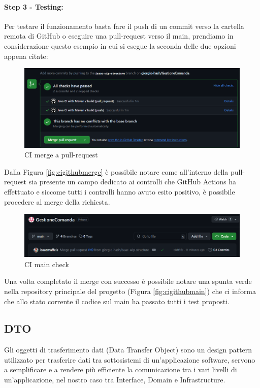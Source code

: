 \paragraph{Step 3 - Testing:}
Per testare il funzionamento basta fare il push di un commit verso la cartella remota di GitHub o eseguire una pull-request verso il main, prendiamo in considerazione questo esempio in cui si esegue la seconda delle due opzioni appena citate:
\begin{figure}[H]
    \centering
    \includegraphics[width=1\linewidth]{iterazione1//images/github_actions_merge.png}
    \caption{CI merge a pull-request}
    \label{fig:cigithubmerge}
\end{figure}
Dalla Figura \vref{fig:cigithubmerge} è possibile notare come all'interno della pull-request sia presente un campo dedicato ai controlli che GitHub Actions ha effettuato e siccome tutti i controlli hanno avuto esito positivo, è possibile procedere al merge della richiesta.
\begin{figure}[H]
    \centering
    \includegraphics[width=1\linewidth]{iterazione1//images/github_actions_main}
    \caption{CI main check}
    \label{fig:cigithubmain}
\end{figure}
Una volta completato il merge con successo è possibile notare una spunta verde nella repository principale del progetto (Figura \vref{fig:cigithubmain}) che ci informa che allo stato corrente il codice sul main ha passato tutti i test proposti.

\subsection{DTO}
Gli oggetti di trasferimento dati (Data Transfer Object) sono un design pattern utilizzato per trasferire dati tra sottosistemi di un’applicazione software, servono a semplificare e a rendere più efficiente la comunicazione tra i vari livelli di un'applicazione, nel nostro caso tra Interface, Domain e Infrastructure.
